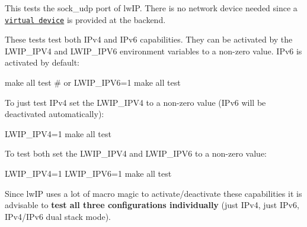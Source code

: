 This tests the {\ttfamily sock\+\_\+udp} port of lw\+IP. There is no network device needed since a \href{http://doc.riot-os.org/group__sys__netdev__test.html}{\tt virtual device} is provided at the backend.

These tests test both I\+Pv4 and I\+Pv6 capabilities. They can be activated by the {\ttfamily L\+W\+I\+P\+\_\+\+I\+P\+V4} and {\ttfamily L\+W\+I\+P\+\_\+\+I\+P\+V6} environment variables to a non-\/zero value. I\+Pv6 is activated by default\+:


\begin{DoxyCode}
make all test
# or
LWIP\_IPV6=1 make all test
\end{DoxyCode}


To just test I\+Pv4 set the {\ttfamily L\+W\+I\+P\+\_\+\+I\+P\+V4} to a non-\/zero value (I\+Pv6 will be deactivated automatically)\+:


\begin{DoxyCode}
LWIP\_IPV4=1 make all test
\end{DoxyCode}


To test both set the {\ttfamily L\+W\+I\+P\+\_\+\+I\+P\+V4} and {\ttfamily L\+W\+I\+P\+\_\+\+I\+P\+V6} to a non-\/zero value\+:


\begin{DoxyCode}
LWIP\_IPV4=1 LWIP\_IPV6=1 make all test
\end{DoxyCode}


Since lw\+IP uses a lot of macro magic to activate/deactivate these capabilities it is advisable to {\bfseries test all three configurations individually} (just I\+Pv4, just I\+Pv6, I\+Pv4/\+I\+Pv6 dual stack mode). 